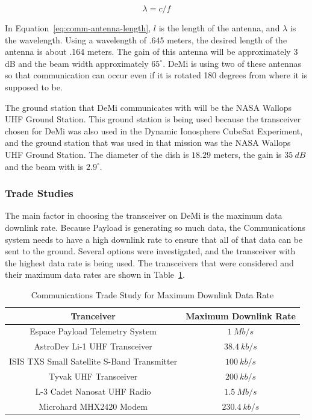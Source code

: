 \documentclass[12pt]{article}
\begin{document}
\begin{equation}\label{eq:comm-antenna-length}
\lambda = c/f
\end{equation}

In Equation~\ref{eq:comm-antenna-length}, $l$ is the length of the antenna, and $\lambda$ is the wavelength.
Using a wavelength of .645 meters, the desired length of the antenna is about .164 meters. The
gain of this antenna will be approximately 3 dB and the beam width approximately $65^\circ$. DeMi is
using two of these antennas so that communication can occur even if it is rotated 180 degrees
from where it is supposed to be.

The ground station that DeMi communicates with will be the NASA Wallops UHF Ground Station. This ground station is being used because the transceiver chosen for DeMi was also used in the Dynamic Ionosphere CubeSat Experiment, and the ground station that was used in that mission was the NASA Wallops UHF Ground Station. The diameter of the dish is $18.29$ meters, the gain is $35\ dB$ and the beam with is $2.9^\circ$.


\subsubsection{Trade Studies} \label{sec:communications-trade-studies}

The main factor in choosing the transceiver on DeMi is the maximum data downlink rate. Because Payload is generating so much data, the Communications system needs to have a high downlink rate to ensure that all of that data can be sent to the ground. Several options were investigated, and the transceiver with the highest data rate is being used. The transceivers that were considered and their maximum data rates are shown in Table~\ref{table:comm_transceivers}.

\begin{table}[ht]
\caption{Communications Trade Study for Maximum Downlink Data Rate}
\begin{center}
    \begin{tabular}{| c | c |} \hline
    	\textbf{Tranceiver} & \textbf{Maximum Downlink Rate} \\ \hline \hline
Espace Payload Telemetry System & $1\ Mb/s$ \\
AstroDev Li-1 UHF Transceiver & $38.4\ kb/s$ \\
ISIS TXS Small Satellite  S-Band Transmitter & $100\ kb/s$ \\
Tyvak UHF Transceiver & $200\ kb/s$ \\
L-3 Cadet Nanosat UHF Radio & $1.5\ Mb/s$ \\
Microhard MHX2420 Modem & $230.4\ kb/s$ \\ \hline 
    \end{tabular}\label{table:comm_transceivers}
\end{center}
\end{table}
\end{document}
